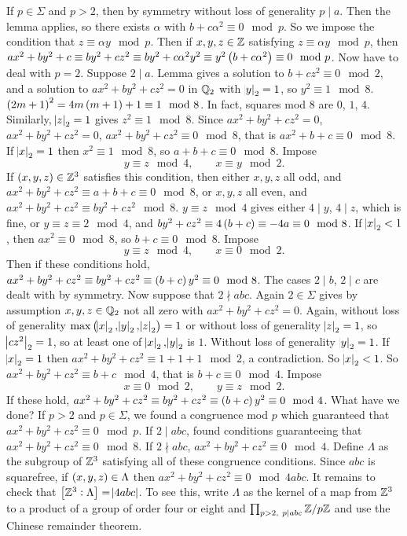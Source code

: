 If $ p \in \Sigma $ and $ p > 2 $, then by symmetry without loss of generality $ p \mid a $. Then the lemma applies, so there exists $ \alpha $ with $ b + c\alpha^2 \equiv 0 \mod p $. So we impose the condition that $ z \equiv \alpha y \mod p $. Then if $ x, y, z \in \mathbb{Z} $ satisfying $ z \equiv \alpha y \mod p $, then $ ax^2 + by^2 + c \equiv by^2 + cz^2 \equiv by^2 + c\alpha^2y^2 \equiv y^2\br{b + c\alpha^2} \equiv 0 \mod p $. Now have to deal with $ p = 2 $. Suppose $ 2 \mid a $. Lemma gives a solution to $ b + cz^2 \equiv 0 \mod 2 $, and a solution to $ ax^2 + by^2 + cz^2 = 0 $ in $ \mathbb{Q}_2 $ with $ \abs{y}_2 = 1 $, so $ y^2 \equiv 1 \mod 8 $. $ \br{2m + 1}^2 = 4m\br{m + 1} + 1 \equiv 1 \mod 8 $. In fact, squares mod $ 8 $ are $ 0 $, $ 1 $, $ 4 $. Similarly, $ \abs{z}_2 = 1 $ gives $ z^2 \equiv 1 \mod 8 $. Since $ ax^2 + by^2 + cz^2 = 0 $, $ ax^2 + by^2 + cz^2 = 0 $, $ ax^2 + by^2 + cz^2 \equiv 0 \mod 8 $, that is $ ax^2 + b + c \equiv 0 \mod 8 $. If $ \abs{x}_2 = 1 $ then $ x^2 \equiv 1 \mod 8 $, so $ a + b + c \equiv 0 \mod 8 $. Impose
$$ y \equiv z \mod 4, \qquad x \equiv y \mod 2. $$
If $ \br{x, y, z} \in \Z^3 $ satisfies this condition, then either $ x, y, z $ all odd, and $ ax^2 + by^2 + cz^2 \equiv a + b + c \equiv 0 \mod 8 $, or $ x, y, z $ all even, and $ ax^2 + by^2 + cz^2 \equiv by^2 + cz^2 \mod 8 $. $ y \equiv z \mod 4 $ gives either $ 4 \mid y $, $ 4 \mid z $, which is fine, or $ y \equiv z \equiv 2 \mod 4 $, and $ by^2 + cz^2 \equiv 4\br{b + c} \equiv -4a \equiv 0 \mod 8 $. If $ \abs{x}_2 < 1 $, then $ ax^2 \equiv 0 \mod 8 $, so $ b + c \equiv 0 \mod 8 $. Impose
$$ y \equiv z \mod 4, \qquad x \equiv 0 \mod 2. $$
Then if these conditions hold, $ ax^2 + by^2 + cz^2 \equiv by^2 + cz^2 \equiv \br{b + c}y^2 \equiv 0 \mod 8 $. The cases $ 2 \mid b $, $ 2 \mid c $ are dealt with by symmetry. Now suppose that $ 2 \nmid abc $. Again $ 2 \in \Sigma $ gives by assumption $ x, y, z \in \mathbb{Q}_2 $ not all zero with $ ax^2 + by^2 + cz^2 = 0 $. Again, without loss of generality $ \max\br{\abs{x}_2, \abs{y}_2, \abs{z}_2} = 1 $ or without loss of generality $ \abs{z}_2 = 1 $, so $ \abs{cz^2}_2 = 1 $, so at least one of $ \abs{x}_2, \abs{y}_2 $ is $ 1 $. Without loss of generality $ \abs{y}_2 = 1 $. If $ \abs{x}_2 = 1 $ then $ ax^2 + by^2 + cz^2 \equiv 1 + 1 + 1 \mod 2 $, a contradiction. So $ \abs{x}_2 < 1 $. So $ ax^2 + by^2 + cz^2 \equiv b + c \mod 4 $, that is $ b + c \equiv 0 \mod 4 $. Impose
$$ x \equiv 0 \mod 2, \qquad y \equiv z \mod 2. $$
If these hold, $ ax^2 + by^2 + cz^2 \equiv by^2 + cz^2 \equiv \br{b + c}y^2 \equiv 0 \mod 4 $. What have we done? If $ p > 2 $ and $ p \in \Sigma $, we found a congruence mod $ p $ which guaranteed that $ ax^2 + by^2 + cz^2 \equiv 0 \mod p $. If $ 2 \mid abc $, found conditions guaranteeing that $ ax^2 + by^2 + cz^2 \equiv 0 \mod 8 $. If $ 2 \nmid abc $, $ ax^2 + by^2 + cz^2 \equiv 0 \mod 4 $. Define $ \Lambda $ as the subgroup of $ \mathbb{Z}^3 $ satisfying all of these congruence conditions. Since $ abc $ is squarefree, if $ \br{x, y, z} \in \Lambda $ then $ ax^2 + by^2 + cz^2 \equiv 0 \mod 4abc $. It remains to check that $ \sbr{\Z^3 : \Lambda} = \abs{4abc} $. To see this, write $ \Lambda $ as the kernel of a map from $ \mathbb{Z}^3 $ to a product of a group of order four or eight and $ \prod_{p > 2, \ p \mid abc} \mathbb{Z} / p\mathbb{Z} $ and use the Chinese remainder theorem.

